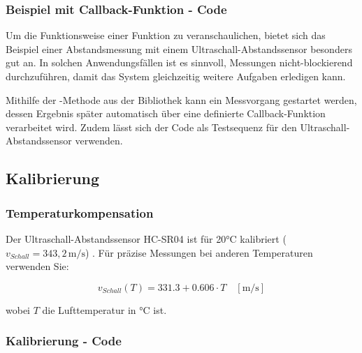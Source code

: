\subsubsection{Beispiel  mit Callback-Funktion - Code}

Um die Funktionsweise einer Funktion  zu veranschaulichen, bietet sich das Beispiel einer Abstandsmessung mit einem Ultraschall-Abstandssensor besonders gut an. In solchen Anwendungsfällen ist es sinnvoll, Messungen nicht-blockierend durchzuführen, damit das System gleichzeitig weitere Aufgaben erledigen kann. 

Mithilfe der -Methode aus der Bibliothek   kann ein Messvorgang gestartet werden, dessen Ergebnis später automatisch über eine definierte Callback-Funktion verarbeitet wird. Zudem lässt sich der Code  als Testsequenz für den Ultraschall-Abstandssensor verwenden.


{
}
	

\subsection{Kalibrierung}
\label{subsection:Kalibrierung}
\subsubsection{Temperaturkompensation}
Der Ultraschall-Abstandssensor HC-SR04 ist für 20°C kalibriert ($v_{Schall}=343,2\,\text{m/s}$) \cite{Hering:2023}. Für präzise Messungen bei anderen Temperaturen verwenden Sie:

\begin{equation}
	v_{Schall}(T) = 331.3 + 0.606 \cdot T \quad [\text{m/s}]
\end{equation}

wobei $T$ die Lufttemperatur in °C ist.

\subsubsection{Kalibrierung - Code}
{
}

